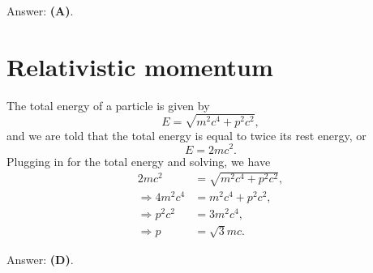\documentclass[11pt]{paper}
\newcommand{\answer}[1]{Answer: \textbf{(#1)}.}
\begin{document}
\answer{A}

\section{Relativistic momentum}
The total energy of a particle is given by
\begin{equation}
E = \sqrt{m^2 c^4 + p^2 c^2},
\end{equation}
and we are told that the total energy is equal to twice its rest energy, or
\begin{equation}
E = 2 m c^2.
\end{equation}
Plugging in for the total energy and solving, we have
\begin{align}
2 m c^2 &= \sqrt{m^2 c^4 + p^2 c^2},\\
\Rightarrow 4 m^2 c^4 &= m^2 c^4 + p^2 c^2,\\
\Rightarrow p^2 c^2 &= 3 m^2 c^4,\\
\Rightarrow p &= \sqrt{3} m c.
\end{align}

\answer{D}
\end{document}
